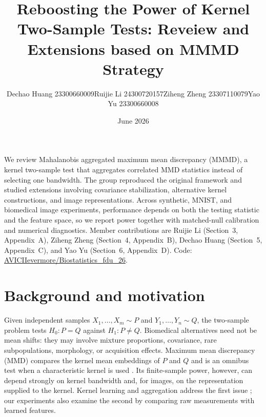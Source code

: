 \documentclass[12pt]{article}
\title{\vspace{-1.8cm}\textbf{Reboosting the Power of Kernel Two-Sample Tests: Reveiew and Extensions based on MMMD Strategy}}
\author{\footnotesize Dechao Huang 23300660009\quad Ruijie Li 24300720157\quad Ziheng Zheng 23307110079\quad Yao Yu 23300660008}
\date{June 2026}
\renewenvironment{abstract}{%
  \begin{center}
  \bfseries\abstractname
  \end{center}
  \small\noindent\ignorespaces
}{\par\normalsize}
\begin{document}
\maketitle

\begingroup
{}
\setlength{\parskip}{0pt}
\setlength{\abovedisplayskip}{3pt}
\setlength{\belowdisplayskip}{3pt}
\setlength{\textfloatsep}{5pt}
\vspace{-1.0em}
\begin{abstract}
We review Mahalanobis aggregated maximum mean discrepancy (MMMD), a kernel two-sample test that aggregates correlated MMD statistics instead of selecting one bandwidth. The group reproduced the original framework and studied extensions involving covariance stabilization, alternative kernel constructions, and image representations. Across synthetic, MNIST, and biomedical image experiments, performance depends on both the testing statistic and the feature space, so we report power together with matched-null calibration and numerical diagnostics. Member contributions are Ruijie Li (Section~3, Appendix~A), Ziheng Zheng (Section~4, Appendix~B), Dechao Huang (Section~5, Appendix~C), and Yao Yu (Section~6, Appendix~D). Code: \href{https://github.com/AVICIIevermore/Biostatistics_fdu_26}{AVICIIevermore/Biostatistics\_fdu\_26}.
\end{abstract}
\small
\section{Background and motivation}
Given independent samples $X_1,\ldots,X_m\sim P$ and $Y_1,\ldots,Y_n\sim Q$, the two-sample problem tests $H_0:P=Q$ against $H_1:P\neq Q$. Biomedical alternatives need not be mean shifts: they may involve mixture proportions, covariance, rare subpopulations, morphology, or acquisition effects. Maximum mean discrepancy (MMD) compares the kernel mean embeddings of $P$ and $Q$ and is an omnibus test when a characteristic kernel is used \cite{gretton2012}. Its finite-sample power, however, can depend strongly on kernel bandwidth and, for images, on the representation supplied to the kernel. Kernel learning and aggregation address the first issue \cite{liu2020,schrab2023}; our experiments also examine the second by comparing raw measurements with learned features.
\end{document}
